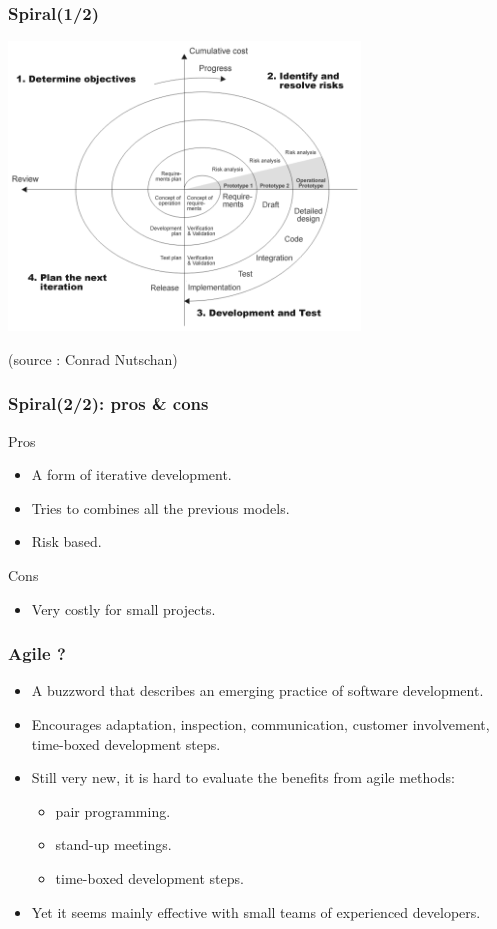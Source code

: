 \documentclass[10pt, handout]{beamer}
\begin{document}
\begin{frame}[fragile]
  \frametitle{Spiral(1/2)}
  \begin{center}
    \includegraphics[width=0.7\textwidth]{spiral_model}
  \end{center}

  \tiny (source : Conrad Nutschan)
\end{frame}
\begin{frame}[fragile]
  \frametitle{Spiral(2/2): pros \& cons}
  \begin{exampleblock}{Pros}
    \begin{itemize}
    \item A form of iterative development.
    \item Tries to combines all the previous models.
    \item Risk based.
    \end{itemize}
  \end{exampleblock}
  \begin{alertblock}{Cons}
    \begin{itemize}
    \item Very costly for small projects.
    \end{itemize}
  \end{alertblock}
\end{frame}


\begin{frame}[fragile]
  \frametitle{Agile ?}
  \begin{itemize}
  \item A buzzword that describes an emerging practice of software development.
  \item Encourages adaptation, inspection, communication, customer involvement,
    time-boxed development steps.
  \item Still very new, it is hard to evaluate the benefits from agile methods:
    \begin{itemize}
    \item pair programming.
    \item stand-up meetings.
    \item time-boxed development steps.
    \end{itemize}
  \item Yet it seems mainly effective with small teams of experienced developers.
  \end{itemize}
\end{frame}
\end{document}
